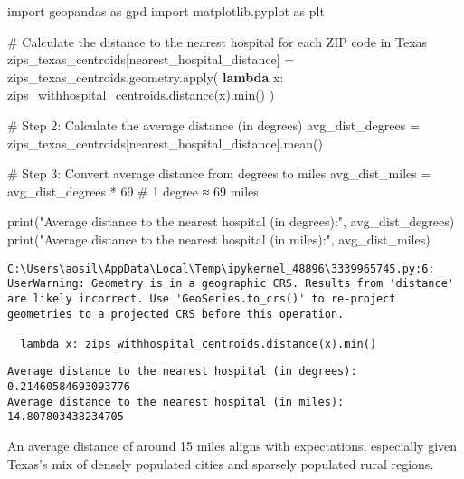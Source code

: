\documentclass[
  letterpaper,
  DIV=11,
  numbers=noendperiod]{scrartcl}
\newenvironment{Shaded}{\begin{snugshade}}{\end{snugshade}}
\newcommand{\BuiltInTok}[1]{\textcolor[rgb]{0.00,0.23,0.31}{#1}}
\newcommand{\CommentTok}[1]{\textcolor[rgb]{0.37,0.37,0.37}{#1}}
\newcommand{\DecValTok}[1]{\textcolor[rgb]{0.68,0.00,0.00}{#1}}
\newcommand{\ImportTok}[1]{\textcolor[rgb]{0.00,0.46,0.62}{#1}}
\newcommand{\KeywordTok}[1]{\textcolor[rgb]{0.00,0.23,0.31}{\textbf{#1}}}
\newcommand{\NormalTok}[1]{\textcolor[rgb]{0.00,0.23,0.31}{#1}}
\newcommand{\OperatorTok}[1]{\textcolor[rgb]{0.37,0.37,0.37}{#1}}
\newcommand{\StringTok}[1]{\textcolor[rgb]{0.13,0.47,0.30}{#1}}
\begin{document}
\begin{Shaded}
\begin{Highlighting}[]
\ImportTok{import}\NormalTok{ geopandas }\ImportTok{as}\NormalTok{ gpd}
\ImportTok{import}\NormalTok{ matplotlib.pyplot }\ImportTok{as}\NormalTok{ plt}

\CommentTok{\# Calculate the distance to the nearest hospital for each ZIP code in Texas}
\NormalTok{zips\_texas\_centroids[}\StringTok{\textquotesingle{}nearest\_hospital\_distance\textquotesingle{}}\NormalTok{] }\OperatorTok{=}\NormalTok{ zips\_texas\_centroids.geometry.}\BuiltInTok{apply}\NormalTok{(}
    \KeywordTok{lambda}\NormalTok{ x: zips\_withhospital\_centroids.distance(x).}\BuiltInTok{min}\NormalTok{()}
\NormalTok{)}

\CommentTok{\# Step 2: Calculate the average distance (in degrees)}
\NormalTok{avg\_dist\_degrees }\OperatorTok{=}\NormalTok{ zips\_texas\_centroids[}\StringTok{\textquotesingle{}nearest\_hospital\_distance\textquotesingle{}}\NormalTok{].mean()}

\CommentTok{\# Step 3: Convert average distance from degrees to miles}
\NormalTok{avg\_dist\_miles }\OperatorTok{=}\NormalTok{ avg\_dist\_degrees }\OperatorTok{*} \DecValTok{69}  \CommentTok{\# 1 degree ≈ 69 miles}

\BuiltInTok{print}\NormalTok{(}\StringTok{"Average distance to the nearest hospital (in degrees):"}\NormalTok{, avg\_dist\_degrees)}
\BuiltInTok{print}\NormalTok{(}\StringTok{"Average distance to the nearest hospital (in miles):"}\NormalTok{, avg\_dist\_miles)}
\end{Highlighting}
\end{Shaded}

\begin{verbatim}
C:\Users\aosil\AppData\Local\Temp\ipykernel_48896\3339965745.py:6: UserWarning: Geometry is in a geographic CRS. Results from 'distance' are likely incorrect. Use 'GeoSeries.to_crs()' to re-project geometries to a projected CRS before this operation.

  lambda x: zips_withhospital_centroids.distance(x).min()
\end{verbatim}

\begin{verbatim}
Average distance to the nearest hospital (in degrees): 0.21460584693093776
Average distance to the nearest hospital (in miles): 14.807803438234705
\end{verbatim}

An average distance of around 15 miles aligns with expectations,
especially given Texas's mix of densely populated cities and sparsely
populated rural regions.
\end{document}
